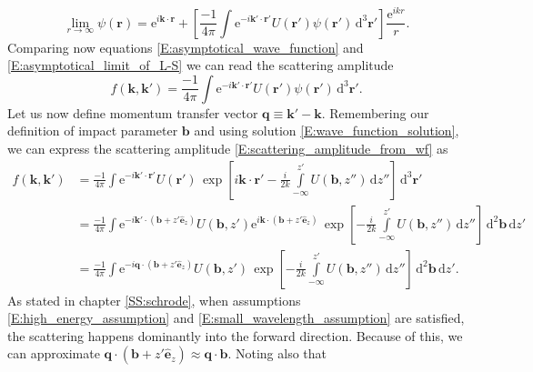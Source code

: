 \documentclass[a4paper, twoside, english, 12pt]{article}
\begin{document}
\begin{equation}\label{E:asymptotical_limit_of_L-S}
	\lim\limits_{r\rightarrow\infty} \psi(\mathbf{r}) = \text{e}^{i\mathbf{k}\cdot\mathbf{r}} + \left[\frac{-1}{4\pi}\int \text{e}^{-i\mathbf{k'}\cdot\mathbf{r'}}U(\mathbf{r'})\psi(\mathbf{r'})\,\text{d}^3\mathbf{r'}\right]\frac{\text{e}^{ikr}}{r}.
\end{equation}
Comparing now equations \eqref{E:asymptotical_wave_function} and \eqref{E:asymptotical_limit_of_L-S} we can read the scattering amplitude
\begin{equation}\label{E:scattering_amplitude_from_wf}
	f(\mathbf{k},\mathbf{k'}) = \frac{-1}{4\pi}\int \text{e}^{-i\mathbf{k'}\cdot\mathbf{r'}}U(\mathbf{r'})\psi(\mathbf{r'})\,\text{d}^3\mathbf{r'}.
\end{equation}
Let us now define momentum transfer vector $\mathbf{q}\equiv\mathbf{k'}-\mathbf{k}$. Remembering our definition of impact parameter $\mathbf{b}$ and using solution \eqref{E:wave_function_solution}, we can express the scattering amplitude \eqref{E:scattering_amplitude_from_wf} as
\begin{align}\label{E:scattering_amplitude_incomplete}
	f(\mathbf{k},\mathbf{k'}) &=\frac{-1}{4\pi}\int \text{e}^{-i\mathbf{k'}\cdot\mathbf{r'}}U(\mathbf{r'})\, \exp\left[i\mathbf{k}\cdot\mathbf{r'}-\frac{i}{2k}\int\limits^{z'}_{-\infty} U(\mathbf{b},z'')\,\text{d}z''\right]\,\text{d}^3\mathbf{r'} \nonumber \\
	 &=\frac{-1}{4\pi}\int \text{e}^{-i\mathbf{k'}\cdot\left(\mathbf{b}+z'\hat{\mathbf{e}}_z\right)}U(\mathbf{b},z') \text{e}^{i\mathbf{k}\cdot\left(\mathbf{b}+z'\hat{\mathbf{e}}_z\right)} \, \exp\left[-\frac{i}{2k}\int\limits^{z'}_{-\infty} U(\mathbf{b},z'')\,\text{d}z''\right]\,\text{d}^2\mathbf{b}\,\text{d}z' \nonumber \\
	 &=\frac{-1}{4\pi}\int \text{e}^{-i\mathbf{q}\cdot\left(\mathbf{b}+z'\hat{\mathbf{e}}_z\right)}U(\mathbf{b},z') \, \exp\left[-\frac{i}{2k}\int\limits^{z'}_{-\infty} U(\mathbf{b},z'')\,\text{d}z''\right]\,\text{d}^2\mathbf{b}\,\text{d}z'.
\end{align}
As stated in chapter \ref{SS:schrode}, when assumptions \eqref{E:high_energy_assumption} and \eqref{E:small_wavelength_assumption} are satisfied, the scattering happens dominantly into the forward direction. Because of this, we can approximate $\mathbf{q}\cdot\left(\mathbf{b}+z'\hat{\mathbf{e}}_z\right)\approx\mathbf{q}\cdot\mathbf{b}$. Noting also that
\end{document}
